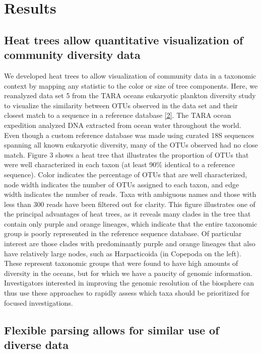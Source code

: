 \documentclass[10pt,letterpaper]{article}
\begin{document}
\section*{Results}\label{results}


\subsection*{Heat trees allow quantitative visualization of community
diversity
data}\label{heat-trees-allow-quantitative-visualization-of-community-diversity-data}

We developed heat trees to allow visualization of community data in a
taxonomic context by mapping any statistic to the color or size of tree
components. Here, we reanalyzed data set 5 from the TARA oceans
eukaryotic plankton diversity study to visualize the similarity between
OTUs observed in the data set and their closest match to a sequence in a
reference database \hyperref[csl:2]{[2]}. The TARA ocean expedition
analyzed DNA extracted from ocean water throughout the world. Even
though a custom reference database was made using curated 18S sequences
spanning all known eukaryotic diversity, many of the OTUs observed had
no close match. Figure 3 shows a heat tree that illustrates the
proportion of OTUs that were well characterized in each taxon (at least
90\% identical to a reference sequence). Color indicates the percentage
of OTUs that are well characterized, node width indicates the number of
OTUs assigned to each taxon, and edge width indicates the number of
reads. Taxa with ambiguous names and those with less than 300 reads have
been filtered out for clarity. This figure illustrates one of the
principal advantages of heat trees, as it reveals many clades in the
tree that contain only purple and orange lineages, which indicate that
the entire taxonomic group is poorly represented in the reference
sequence database. Of particular interest are those clades with
predominantly purple and orange lineages that also have relatively large
nodes, such as Harpacticoida (in Copepoda on the left). These represent
taxonomic groups that were found to have high amounts of diversity in
the oceans, but for which we have a paucity of genomic information.
Investigators interested in improving the genomic resolution of the
biosphere can thus use these approaches to rapidly assess which taxa
should be prioritized for focused investigations.


\subsection*{Flexible parsing allows for similar use of diverse
data}\label{flexible-parsing-allows-for-similar-use-of-diverse-data}
\end{document}
